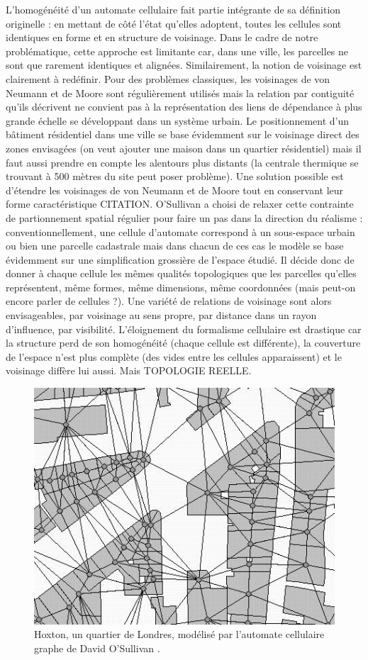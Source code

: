 \documentclass[12pt]{article}
\begin{document}
L'homogénéité d'un automate cellulaire fait partie intégrante de sa
définition originelle : en mettant de côté l'état qu'elles adoptent,
toutes les cellules sont identiques en forme et en structure de
voisinage. Dans le cadre de notre problématique, cette approche est
limitante car, dans une ville, les parcelles ne sont que rarement
identiques et alignées. Similairement, la notion de voisinage est
clairement à redéfinir. Pour des problèmes classiques, les voisinages
de von Neumann et de Moore sont régulièrement utilisés mais la
relation par contiguité qu'ils décrivent ne convient pas à la
représentation des liens de dépendance à plus grande échelle se
développant dans un système urbain. Le positionnement d'un bâtiment
résidentiel dans une ville se base évidemment sur le voisinage direct
des zones envisagées (on veut ajouter une maison dans un quartier
résidentiel) mais il faut aussi prendre en compte les alentours plus
distants (la centrale thermique se trouvant à 500 mètres du site peut
poser problème). Une solution possible est d'étendre les voisinages de
von Neumann et de Moore tout en conservant leur forme caractéristique
CITATION. O'Sullivan a choisi de relaxer cette contrainte de
partionnement spatial régulier pour faire un pas dans la direction du
réalisme \cite{O'Sullivan2000,O'Sullivan2001} : conventionnellement,
une cellule d'automate correspond à un sous-espace urbain ou bien une
parcelle cadastrale mais dans chacun de ces cas le modèle se base
évidemment sur une simplification grossière de l'espace étudié. Il
décide donc de donner à chaque cellule les mêmes qualités topologiques
que les parcelles qu'elles représentent, même formes, même dimensions,
même coordonnées (mais peut-on encore parler de cellules ?). Une
variété de relations de voisinage sont alors envisageables, par
voisinage au sens propre, par distance dans un rayon d'influence, par
visibilité. L'éloignement du formalisme cellulaire est drastique car
la structure perd de son homogénéité (chaque cellule est différente),
la couverture de l'espace n'est plus complète (des vides entre les
cellules apparaissent) et le voisinage diffère lui aussi. Mais
TOPOLOGIE REELLE.

\begin{figure}
  \centering
  \includegraphics[width=.6\linewidth]{images/gca.png}
  \caption{Hoxton, un quartier de Londres, modélisé par l'automate
    cellulaire graphe de David O'Sullivan \cite{O'Sullivan2000}.}
  \label{fig:sullivan}
\end{figure}
\end{document}
